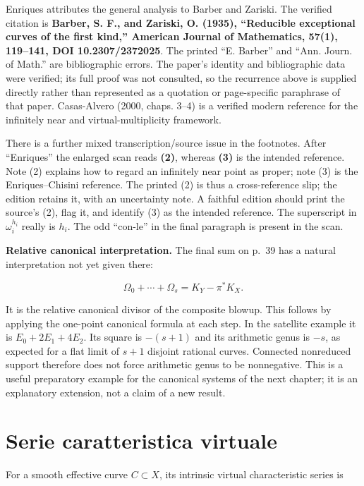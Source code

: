 Enriques attributes the general analysis to Barber and Zariski. The verified citation is \textbf{Barber, S. F., and Zariski, O. (1935), ``Reducible exceptional curves of the first kind,'' American Journal of Mathematics, 57(1), 119--141, DOI 10.2307/2372025}. The printed ``E. Barber'' and ``Ann. Journ. of Math.'' are bibliographic errors. The paper's identity and bibliographic data were verified; its full proof was not consulted, so the recurrence above is supplied directly rather than represented as a quotation or page-specific paraphrase of that paper. Casas-Alvero (2000, chaps. 3--4) is a verified modern reference for the infinitely near and virtual-multiplicity framework.

There is a further mixed transcription/source issue in the footnotes. After ``Enriques'' the enlarged scan reads \textbf{(2)}, whereas \textbf{(3)} is the intended reference. Note (2) explains how to regard an infinitely near point as proper; note (3) is the Enriques--Chisini reference. The printed (2) is thus a cross-reference slip; the edition retains it, with an uncertainty note. A faithful edition should print the source's (2), flag it, and identify (3) as the intended reference. The superscript in \(\omega_i^{h_i}\) really is \(h_i\). The odd ``con-le'' in the final paragraph is present in the scan.

\textbf{Relative canonical interpretation.} The final sum on p.~39 has a natural interpretation not yet given there:

\[
\Omega_0+\cdots+\Omega_s=K_Y-\pi^*K_X.
\]

It is the relative canonical divisor of the composite blowup. This follows by applying the one-point canonical formula at each step. In the satellite example it is \(E_0+2E_1+4E_2\). Its square is \(-(s+1)\) and its arithmetic genus is \(-s\), as expected for a flat limit of \(s+1\) disjoint rational curves. Connected nonreduced support therefore does not force arithmetic genus to be nonnegative. This is a useful preparatory example for the canonical systems of the next chapter; it is an explanatory extension, not a claim of a new result.

\section{Serie caratteristica virtuale}
\label{enriques-I-13}

For a smooth effective curve \(C\subset X\), its intrinsic virtual characteristic series is

